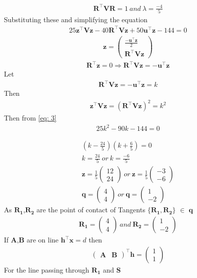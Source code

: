 \documentclass{beamer}
\providecommand{\brak}[1]{\ensuremath{\left(#1\right)}}
\theoremstyle{remark}
\newcommand{\myvec}[1]{\ensuremath{\begin{pmatrix}#1\end{pmatrix}}}
\let\vec\mathbf
\numberwithin{equation}{section}
\numberwithin{equation}{section}
\begin{document}
\begin{frame}
\begin{align}
\vec{R}^\top\vec{V}\vec{R} = 1 \ and \ \lambda = \frac{-4}{5}
\end{align}
Substituting these and simplifying the equation
\begin{align}
25\vec{z}^\top\vec{V}\vec{z} - 40\vec{R}^\top\vec{V}\vec{z} + 50\vec{u}^\top\vec{z} - 144 = 0 \label{eq: 3}
\end{align}
\begin{align}
\vec{z} = \myvec{\frac{-\vec{u}^\top\vec{z}}{2}\\\vec{R}^\top\vec{V}\vec{z}}
\end{align}
\begin{align}
\vec{R}^\top\vec{z} = 0 \Longrightarrow \vec{R}^\top\vec{V}\vec{z} = -\vec{u}^\top\vec{z} 
\end{align}
Let
\begin{align}
\vec{R}^\top\vec{V}\vec{z} = -\vec{u}^\top\vec{z} = k
\end{align}
Then
\begin{align}
\vec{z}^\top\vec{V}\vec{z} = \brak{\vec{R}^\top\vec{V}\vec{z}}^2 = k^2
\end{align}
Then from \eqref{eq: 3}
\begin{align}
25k^2 - 90k - 144 = 0 
\end{align}
\end{frame}
\begin{frame}
\begin{align}
\brak{k - \frac{24}{5}}\brak{k + \frac{6}{5}} = 0 \\
k = \frac{24}{5} \ or \ k=\frac{-6}{5} \\
\vec{z} = \frac{1}{5}\myvec{12\\24} \ or \ \vec{z} = \frac{1}{5}\myvec{-3\\-6} \\
\vec{q} = \myvec{4\\4} \ or \ \vec{q} = \myvec{1\\-2}
\end{align}
As $\vec{R_1}$,$\vec{R_2}$ are the point of contact of Tangents $\{\vec{R_1},\vec{R_2}\}$ $\in$ $\vec{q}$
\begin{align}
\vec{R_1} = \myvec{4\\4} \ and \ \vec{R_2} = \myvec{1\\-2}
\end{align}
If $\vec{A}$,$\vec{B}$ are on line $\vec{h}^\top\vec{x}=d$ then
\begin{align}
\myvec{\vec{A} & \vec{B}}^\top\vec{h} = \myvec{1\\1}
\end{align}
For the line passing through $\vec{R_1}$ and $\vec{S}$
\end{frame}
\end{document}
